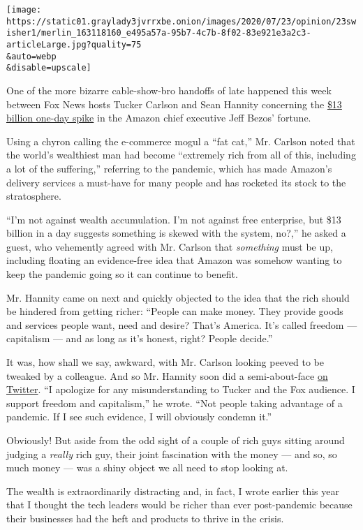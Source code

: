 \texttt{[image: https://static01.graylady3jvrrxbe.onion/images/2020/07/23/opinion/23swisher1/merlin\_163118160\_e495a57a-95b7-4c7b-8f02-83e921e3a2c3-articleLarge.jpg?quality=75\\\&auto=webp\\\&disable=upscale]}

One of the more bizarre cable-show-bro handoffs of late happened this
week between Fox News hosts Tucker Carlson and Sean Hannity concerning
the \href{https://time.com/5869262/jeff-bezos-13-billion/}{\$13 billion
one-day spike} in the Amazon chief executive Jeff Bezos' fortune.

Using a chyron calling the e-commerce mogul a ``fat cat,'' Mr. Carlson
noted that the world's wealthiest man had become ``extremely rich from
all of this, including a lot of the suffering,'' referring to the
pandemic, which has made Amazon's delivery services a must-have for many
people and has rocketed its stock to the stratosphere.

``I'm not against wealth accumulation. I'm not against free enterprise,
but \$13 billion in a day suggests something is skewed with the system,
no?,'' he asked a guest, who vehemently agreed with Mr. Carlson that
\emph{something} must be up, including floating an evidence-free idea
that Amazon was somehow wanting to keep the pandemic going so it can
continue to benefit.

Mr. Hannity came on next and quickly objected to the idea that the rich
should be hindered from getting richer: ``People can make money. They
provide goods and services people want, need and desire? That's America.
It's called freedom --- capitalism --- and as long as it's honest,
right? People decide.''

It was, how shall we say, awkward, with Mr. Carlson looking peeved to be
tweaked by a colleague. And so Mr. Hannity soon did a semi-about-face
\href{https://twitter.com/seanhannity/status/1285761201344057344}{on
Twitter}. ``I apologize for any misunderstanding to Tucker and the Fox
audience. I support freedom and capitalism,'' he wrote. ``Not people
taking advantage of a pandemic. If I see such evidence, I will obviously
condemn it.''

Obviously! But aside from the odd sight of a couple of rich guys sitting
around judging a \emph{really} rich guy, their joint fascination with
the money --- and so, so much money --- was a shiny object we all need
to stop looking at.

The wealth is extraordinarily distracting and, in fact, I wrote earlier
this year that I thought the tech leaders would be richer than ever
post-pandemic because their businesses had the heft and products to
thrive in the crisis.

